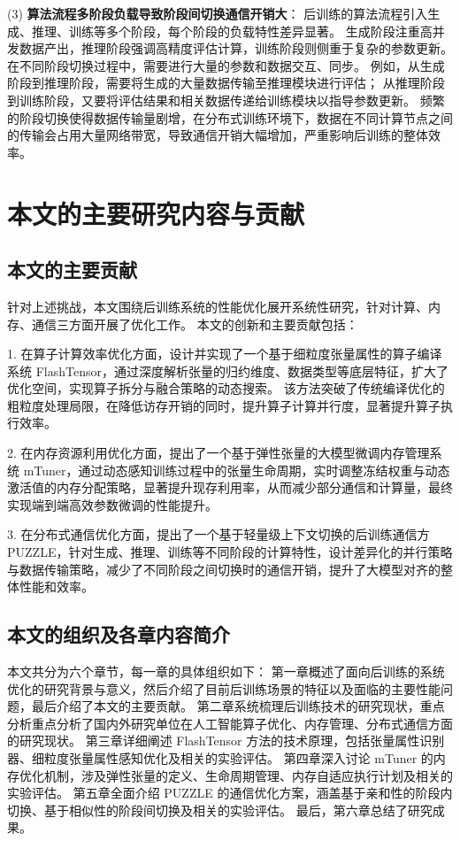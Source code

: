 (3) \textbf{算法流程多阶段负载导致阶段间切换通信开销大}：
后训练的算法流程引入生成、推理、训练等多个阶段，每个阶段的负载特性差异显著。
生成阶段注重高并发数据产出，推理阶段强调高精度评估计算，训练阶段则侧重于复杂的参数更新。
在不同阶段切换过程中，需要进行大量的参数和数据交互、同步。
例如，从生成阶段到推理阶段，需要将生成的大量数据传输至推理模块进行评估；
从推理阶段到训练阶段，又要将评估结果和相关数据传递给训练模块以指导参数更新。
频繁的阶段切换使得数据传输量剧增，在分布式训练环境下，数据在不同计算节点之间的传输会占用大量网络带宽，导致通信开销大幅增加，严重影响后训练的整体效率。


\section{本文的主要研究内容与贡献}

\subsection{本文的主要贡献}
针对上述挑战，本文围绕后训练系统的性能优化展开系统性研究，针对计算、内存、通信三方面开展了优化工作。
本文的创新和主要贡献包括：

1. 在算子计算效率优化方面，设计并实现了一个基于细粒度张量属性的算子编译系统 FlashTensor，通过深度解析张量的归约维度、数据类型等底层特征，扩大了优化空间，实现算子拆分与融合策略的动态搜索。
该方法突破了传统编译优化的粗粒度处理局限，在降低访存开销的同时，提升算子计算并行度，显著提升算子执行效率。

2. 在内存资源利用优化方面，提出了一个基于弹性张量的大模型微调内存管理系统 mTuner，通过动态感知训练过程中的张量生命周期，实时调整冻结权重与动态激活值的内存分配策略，显著提升现存利用率，从而减少部分通信和计算量，最终实现端到端高效参数微调的性能提升。

3. 在分布式通信优化方面，提出了一个基于轻量级上下文切换的后训练通信方 PUZZLE，针对生成、推理、训练等不同阶段的计算特性，设计差异化的并行策略与数据传输策略，减少了不同阶段之间切换时的通信开销，提升了大模型对齐的整体性能和效率。

\subsection{本文的组织及各章内容简介}
本文共分为六个章节，每一章的具体组织如下：
第一章概述了面向后训练的系统优化的研究背景与意义，然后介绍了目前后训练场景的特征以及面临的主要性能问题，最后介绍了本文的主要贡献。
第二章系统梳理后训练技术的研究现状，重点分析重点分析了国内外研究单位在人工智能算子优化、内存管理、分布式通信方面的研究现状。
第三章详细阐述 FlashTensor 方法的技术原理，包括张量属性识别器、细粒度张量属性感知优化及相关的实验评估。
第四章深入讨论 mTuner 的内存优化机制，涉及弹性张量的定义、生命周期管理、内存自适应执行计划及相关的实验评估。
第五章全面介绍 PUZZLE 的通信优化方案，涵盖基于亲和性的阶段内切换、基于相似性的阶段间切换及相关的实验评估。
最后，第六章总结了研究成果。